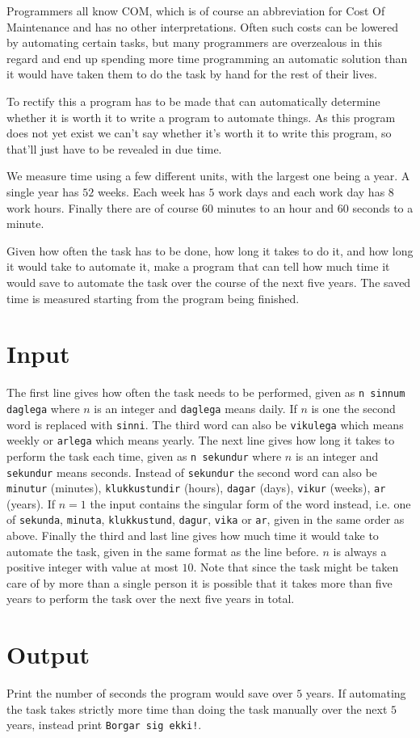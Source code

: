 
Programmers all know COM, which is of course an abbreviation
for Cost Of Maintenance and has no other interpretations.
Often such costs can be lowered by automating certain tasks,
but many programmers are overzealous in this regard and
end up spending more time programming an automatic solution
than it would have taken them to do the task by hand for
the rest of their lives.

To rectify this a program has to be made that can 
automatically determine whether it is worth it to write
a program to automate things. As this program does not yet
exist we can't say whether it's worth it to write this
program, so that'll just have to be revealed in due time.

We measure time using a few different units, with the largest
one being a year. A single year has $52$ weeks. Each week
has $5$ work days and each work day has $8$ work hours.
Finally there are of course $60$ minutes to an hour and
$60$ seconds to a minute.

Given how often the task has to be done, how long it takes
to do it, and how long it would take to automate it, make a
program that can tell how much time it would save to
automate the task over the course of the next five years.
The saved time is measured starting from the program being
finished.

\section*{Input}
The first line gives how often the task needs to be performed,
given as \texttt{n sinnum daglega} where $n$ is an integer
and \texttt{daglega} means daily. If $n$ is one the second
word is replaced with \texttt{sinni}. The third word can
also be \texttt{vikulega} which means weekly or
\texttt{arlega} which means yearly.
The next line gives how long it takes to perform the
task each time, given as \texttt{n sekundur} where $n$
is an integer and \texttt{sekundur} means seconds.
Instead of \texttt{sekundur} the second word can also
be \texttt{minutur} (minutes), \texttt{klukkustundir}
(hours), \texttt{dagar} (days), \texttt{vikur} (weeks),
\texttt{ar} (years).
If $n = 1$ the input contains the singular form of the word
instead, i.e. one of \texttt{sekunda}, \texttt{minuta},
\texttt{klukkustund}, \texttt{dagur}, \texttt{vika} or
\texttt{ar}, given in the same order as above.
Finally the third and last line gives how much time it
would take to automate the task, given in the same format
as the line before.
$n$ is always a positive integer with value at most $10$.
Note that since the task might be taken care of by more than
a single person it is possible that it takes more than five
years to perform the task over the next five years in total.

\section*{Output}
Print the number of seconds the program would save over $5$
years. If automating the task takes strictly more time than
doing the task manually over the next $5$ years, instead print
\texttt{Borgar sig ekki!}.
